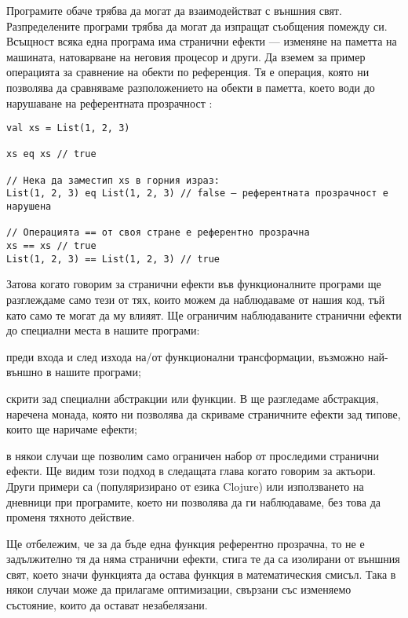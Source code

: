Програмите обаче трябва да могат да взаимодействат с външния свят. Разпределените програми трябва да могат да изпращат съобщения помежду си. Всъщност всяка една програма има странични ефекти — изменяне на паметта на машината, натоварване на неговия процесор и други. Да вземем за пример операцията за сравнение на обекти по референция. Тя е операция, която ни позволява да сравняваме разположението на обекти в паметта, което води до нарушаване на референтната прозрачност \cite{chiusano2014FPinScala}:

\begin{lstlisting}[texcl=true]
val xs = List(1, 2, 3)

xs eq xs // true

// Нека да заместип xs в горния израз:
List(1, 2, 3) eq List(1, 2, 3) // false — референтната прозрачност е нарушена

// Операцията == от своя стране е референтно прозрачна
xs == xs // true
List(1, 2, 3) == List(1, 2, 3) // true
\end{lstlisting}

Затова когато говорим за странични ефекти във функционалните програми ще разглеждаме само тези от тях, които можем да наблюдаваме от нашия код, тъй като само те могат да му влияят. Ще ограничим наблюдаваните странични ефекти до специални места в нашите програми:

\begin{itemize*}
  \item преди входа и след изхода на/от функционални трансформации, възможно най-външно в нашите програми;
  \item скрити зад специални абстракции или функции. В  ще разгледаме абстракция, наречена монада, която ни позволява да скриваме страничните ефекти зад типове, които ще наричаме ефекти;
  \item в някои случаи ще позволим само ограничен набор от проследими странични ефекти. Ще видим този подход в следащата глава когато говорим за актьори. Други примери са  (популяризирано от езика Clojure) или използването на дневници при програмите, което ни позволява да ги наблюдаваме, без това да променя тяхното действие.
\end{itemize*}

Ще отбележим, че за да бъде една функция референтно прозрачна, то не е задължително тя да няма странични ефекти, стига те да са изолирани от външния свят, което значи функцията да остава функция в математическия смисъл. Така в някои случаи може да прилагаме оптимизации, свързани със изменяемо състояние, които да остават незабелязани.

